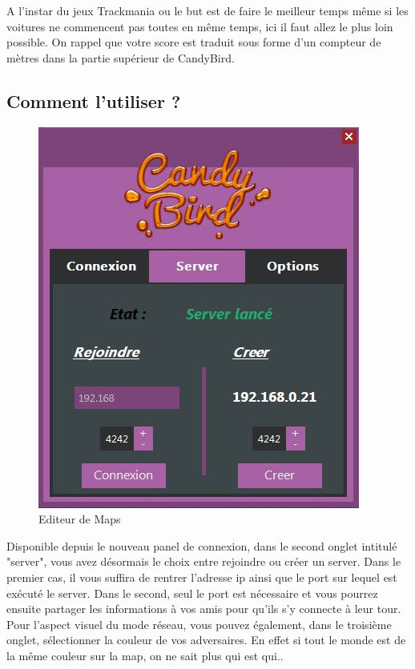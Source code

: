 \documentclass [11pt]{report}
\begin{document}
		A l'instar du jeux Trackmania ou le but est de faire le meilleur temps même si les voitures ne commencent pas toutes en même temps, ici il faut allez le plus loin possible. On rappel que votre score est traduit sous forme d'un compteur de mètres dans la partie supérieur de CandyBird.
		
		\newpage
		
		\subsection{Comment l'utiliser ?}
		
		\vspace{6mm}
		
		\begin{figure}[h]
			\centering
			\includegraphics[width=0.6\linewidth]{images/panel.jpg}
			\caption[Editeur de Maps]{Editeur de Maps}
			\label{fig:Editeur}
		\end{figure}
		
		\vspace{6mm}
				
		Disponible depuis le nouveau panel de connexion, dans le second onglet intitulé "server", vous avez désormais le choix entre rejoindre ou créer un server. Dans le premier cas, il vous suffira de rentrer l'adresse ip ainsi que le port sur lequel est exécuté le server. Dans le second, seul le port est nécessaire et vous pourrez ensuite partager les informations à vos amis pour qu'ils s'y connecte à leur tour. Pour l'aspect visuel du mode réseau, vous pouvez également, dans le troisième onglet, sélectionner la couleur de vos adversaires. En effet si tout le monde est de la même couleur sur la map, on ne sait plus qui est qui..\\		
		
\end{document}

